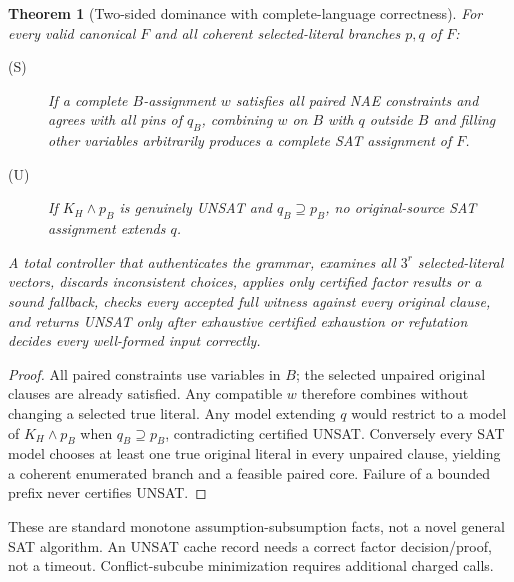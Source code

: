 \documentclass[10pt]{article}
\newtheorem{theorem}{Theorem}
\begin{document}
\begin{theorem}[Two-sided dominance with complete-language correctness]
For every valid canonical $F$ and all coherent selected-literal branches $p,q$ of $F$:
\begin{description}
\item[(S)] If a complete $B$-assignment $w$ satisfies all paired NAE constraints and agrees with all pins of $q_B$, combining $w$ on $B$ with $q$ outside $B$ and filling other variables arbitrarily produces a complete SAT assignment of $F$.
\item[(U)] If $K_H\wedge p_B$ is genuinely UNSAT and $q_B\supseteq p_B$, no original-source SAT assignment extends $q$.
\end{description}
A total controller that authenticates the grammar, examines all $3^r$ selected-literal vectors, discards inconsistent choices, applies only certified factor results or a sound fallback, checks every accepted full witness against every original clause, and returns UNSAT only after exhaustive certified exhaustion or refutation decides every well-formed input correctly.
\end{theorem}
\begin{proof}
All paired constraints use variables in $B$; the selected unpaired original clauses are already satisfied. Any compatible $w$ therefore combines without changing a selected true literal. Any model extending $q$ would restrict to a model of $K_H\wedge p_B$ when $q_B\supseteq p_B$, contradicting certified UNSAT. Conversely every SAT model chooses at least one true original literal in every unpaired clause, yielding a coherent enumerated branch and a feasible paired core. Failure of a bounded prefix never certifies UNSAT.
\end{proof}
These are standard monotone assumption-subsumption facts, not a novel general SAT algorithm. An UNSAT cache record needs a correct factor decision/proof, not a timeout. Conflict-subcube minimization requires additional charged calls.
\end{document}
